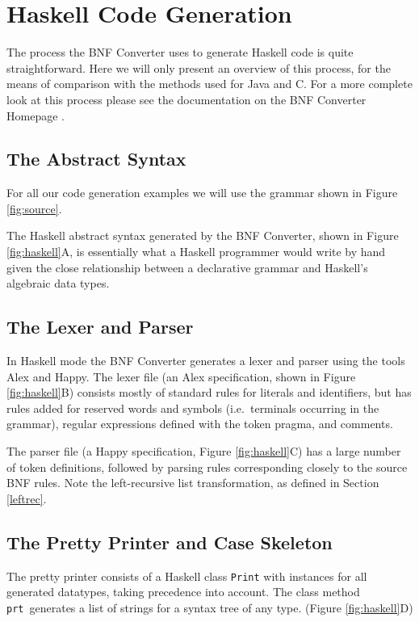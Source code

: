 \section{Haskell Code Generation}

The process the BNF Converter uses to generate Haskell code is quite straightforward. Here we will only present an overview of this process, for the means of comparison with the methods used for Java and C. For a more complete look at this process please see the documentation on the BNF Converter Homepage \cite{bnfcsite}.

\subsection{The Abstract Syntax}

For all our code generation examples we will use the grammar shown in Figure \ref{fig:source}.

The Haskell abstract syntax generated by the
BNF Converter, shown in Figure \ref{fig:haskell}A, is essentially what a Haskell programmer would write by hand given the close relationship between a declarative grammar and Haskell's algebraic data types.

\subsection{The Lexer and Parser}

In Haskell mode the BNF Converter generates a lexer and parser using the tools Alex\cite{alex} and Happy\cite{happy}. The lexer file (an Alex specification, shown in Figure \ref{fig:haskell}B) consists mostly of standard rules for literals and identifiers, but has
rules added for reserved words and symbols (i.e.\ terminals 
occurring in the grammar), regular expressions defined with the token pragma, and comments. 

The parser file (a Happy specification, Figure \ref{fig:haskell}C) has a large number of token definitions,
followed by parsing rules corresponding closely to the source BNF rules. Note the left-recursive list transformation, as defined in Section \ref{leftrec}.

\subsection{The Pretty Printer and Case Skeleton}

The pretty printer consists of a Haskell class {\tt Print} with instances
for all generated datatypes, taking precedence into account. The class method
{\tt prt}\
generates a list of strings for a syntax tree of any type. (Figure \ref{fig:haskell}D)

